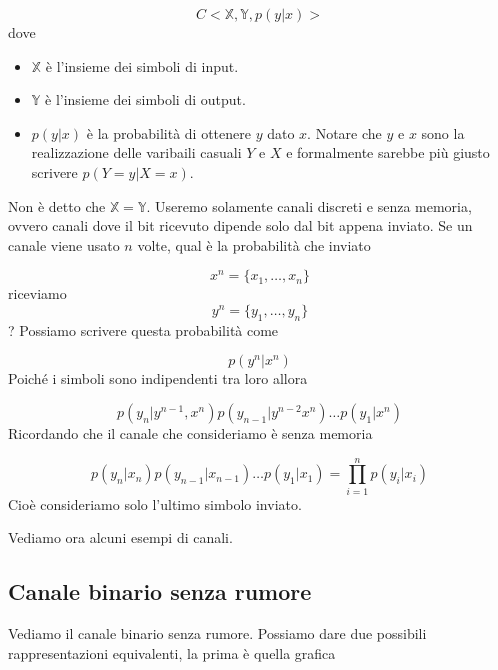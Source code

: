 \documentclass[12pt]{report}
\begin{document}
    $$C< \mathbb{X}, \mathbb{Y}, p(y|x) >$$
    dove
    \begin{itemize}
        \item $\mathbb{X}$ è l'insieme dei simboli di input.
        \item $\mathbb{Y}$ è l'insieme dei simboli di output.
        \item $p(y|x)$ è la probabilità di ottenere $y$ dato $x$. Notare che $y$ e $x$ sono la realizzazione delle varibaili casuali $Y$ e $X$ e formalmente sarebbe più giusto scrivere $p(Y = y | X = x)$.
    \end{itemize}

    \noindent
    Non è detto che $\mathbb{X} = \mathbb{Y}$. Useremo solamente canali discreti e senza memoria, ovvero canali dove il bit ricevuto dipende solo dal bit appena inviato. Se un canale viene usato $n$ volte, qual è la probabilità che inviato

    $$x^n = \{x_1,\dots,x_n\}$$
    riceviamo
    $$y^n = \{y_1,\dots,y_n\}$$
    ? Possiamo scrivere questa probabilità come

    $$p(y^n|x^n)$$
    Poiché i simboli sono indipendenti tra loro allora

    $$p(y_n|y^{n-1},x^n)p(y_{n-1}|y^{n-2} x^n) \dots p(y_{1}| x^n)$$
    Ricordando che il canale che consideriamo è senza memoria

    $$p(y_n|x_n)p(y_{n-1}|x_{n-1}) \dots p(y_{1}| x_1) = \prod_{i=1}^n p(y_i|x_i)$$
    Cioè consideriamo solo l'ultimo simbolo inviato.

    \noindent
    Vediamo  ora alcuni esempi di canali.

    \subsection{Canale binario senza rumore}

    Vediamo il canale binario senza rumore. Possiamo dare due possibili rappresentazioni equivalenti, la prima è quella grafica

    \vspace{10px}
    \begin{center}


    \end{center}
\end{document}
